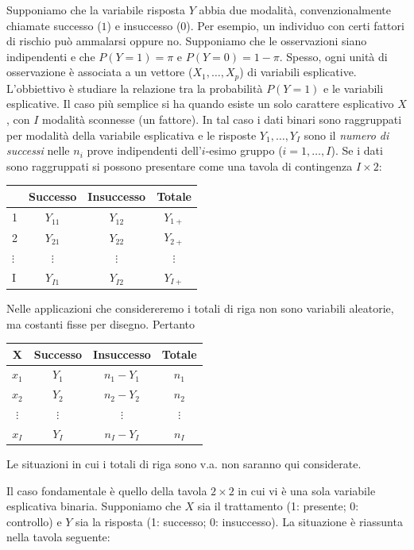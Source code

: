 \documentclass[
  11pt,
]{krantz}
\theoremstyle{definition}
\theoremstyle{definition}
\theoremstyle{definition}
\theoremstyle{definition}
\theoremstyle{remark}
\begin{document}
Supponiamo che la variabile risposta \(Y\) abbia due modalità, convenzionalmente chiamate successo (\(1\)) e insuccesso (\(0\)). Per esempio, un individuo con certi fattori di rischio può ammalarsi oppure no. Supponiamo che le osservazioni siano indipendenti e che \(P(Y=1) = \pi\) e \(P(Y=0) = 1-\pi\). Spesso, ogni unità di osservazione è associata a un vettore (\(X_1, \dots, X_p\)) di variabili esplicative. L'obbiettivo è studiare la relazione tra la probabilità \(P(Y=1)\) e le variabili esplicative. Il caso più semplice si ha quando esiste un solo carattere esplicativo \(X\), con \(I\) modalità sconnesse (un fattore). In tal caso i dati binari sono raggruppati per modalità della variabile esplicativa e le risposte \(Y_1, \dots, Y_I\) sono il \emph{numero di successi} nelle \(n_i\) prove indipendenti dell'\(i\)-esimo gruppo (\(i = 1, \dots, I\)). Se i dati sono raggruppati si possono presentare come una tavola di contingenza \(I \times 2\):

\begin{longtable}[]{@{}lccc@{}}
\toprule
& Successo & Insuccesso & Totale \\
\midrule
\endhead
1 & \(Y_{11}\) & \(Y_{12}\) & \(Y_{1+}\) \\
2 & \(Y_{21}\) & \(Y_{22}\) & \(Y_{2+}\) \\
\(\vdots\) & \(\vdots\) & \(\vdots\) & \(\vdots\) \\
I & \(Y_{I1}\) & \(Y_{I2}\) & \(Y_{I+}\) \\
\bottomrule
\end{longtable}

Nelle applicazioni che considereremo i totali di riga non sono variabili aleatorie, ma costanti fisse per disegno. Pertanto

\begin{longtable}[]{@{}cccc@{}}
\toprule
X & Successo & Insuccesso & Totale \\
\midrule
\endhead
\(x_1\) & \(Y_{1}\) & \(n_1-Y_1\) & \(n_1\) \\
\(x_2\) & \(Y_{2}\) & \(n_2-Y_2\) & \(n_2\) \\
\(\vdots\) & \(\vdots\) & \(\vdots\) & \(\vdots\) \\
\(x_I\) & \(Y_{I}\) & \(n_I-Y_{I}\) & \(n_I\) \\
\bottomrule
\end{longtable}

Le situazioni in cui i totali di riga sono v.a. non saranno qui considerate.

Il caso fondamentale è quello della tavola \(2 \times 2\) in cui vi è una sola variabile esplicativa binaria. Supponiamo che \(X\) sia il trattamento (1: presente; 0: controllo) e \(Y\) sia la risposta (1: successo; 0: insuccesso). La situazione è riassunta nella tavola seguente:
\end{document}
